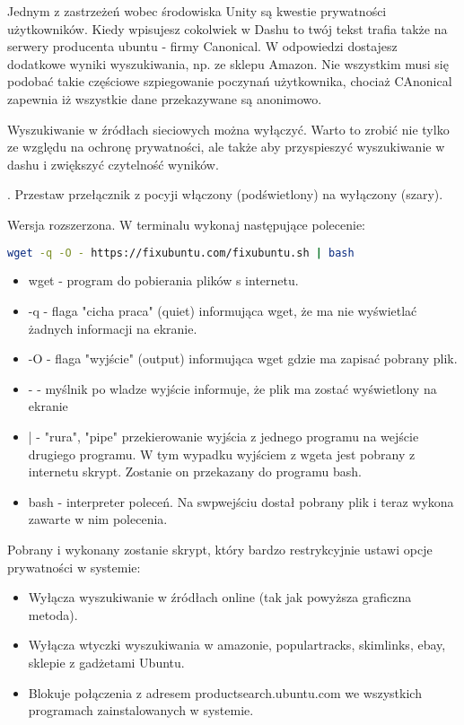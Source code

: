 Jednym z zastrzeżeń wobec środowiska Unity są kwestie prywatności użytkowników. Kiedy wpisujesz cokolwiek w Dashu to twój tekst trafia także na serwery producenta ubuntu - firmy Canonical. W odpowiedzi dostajesz dodatkowe wyniki wyszukiwania, np. ze sklepu Amazon. Nie wszystkim musi się podobać takie częściowe szpiegowanie poczynań użytkownika, chociaż CAnonical zapewnia iż wszystkie dane przekazywane są anonimowo.

Wyszukiwanie w źródłach sieciowych można wyłączyć. Warto to zrobić nie tylko ze względu na ochronę prywatności, ale także aby przyspieszyć wyszukiwanie w dashu i zwiększyć czytelność wyników.

\noindent {}. Przestaw przełącznik z pocyji włączony (podświetlony) na wyłączony (szary).

Wersja rozszerzona. W terminalu wykonaj następujące polecenie:
\begin{lstlisting}[language=bash]
wget -q -O - https://fixubuntu.com/fixubuntu.sh | bash
\end{lstlisting}
\begin{itemize}
\item \textcolor{ubuntu_orange}{wget} - program do pobierania plików s internetu.
\item \textcolor{ubuntu_orange}{-q} - flaga "cicha praca" (quiet) informująca wget, że ma nie wyświetlać żadnych informacji na ekranie.
\item \textcolor{ubuntu_orange}{-O} - flaga "wyjście" (output) informująca wget gdzie ma zapisać pobrany plik.
\item \textcolor{ubuntu_orange}{-} - myślnik po wladze wyjście informuje, że plik ma zostać wyświetlony na ekranie
\item \textcolor{ubuntu_orange}{|} - "rura", "pipe" przekierowanie wyjścia z jednego programu na wejście drugiego programu. W tym wypadku wyjściem z wgeta jest pobrany z internetu skrypt. Zostanie on przekazany do programu bash.
\item \textcolor{ubuntu_orange}{bash} - interpreter poleceń. Na swpwejściu dostał pobrany plik i teraz wykona zawarte w nim polecenia.
\end{itemize}
Pobrany i wykonany zostanie skrypt, który bardzo restrykcyjnie ustawi opcje prywatności w systemie:
\begin{itemize}
\item Wyłącza wyszukiwanie w źródłach online (tak jak powyższa graficzna metoda).
\item Wyłącza wtyczki wyszukiwania w amazonie, populartracks, skimlinks, ebay, sklepie z gadżetami Ubuntu.
\item Blokuje połączenia z adresem productsearch.ubuntu.com we wszystkich programach zainstalowanych w systemie.
\end{itemize}
